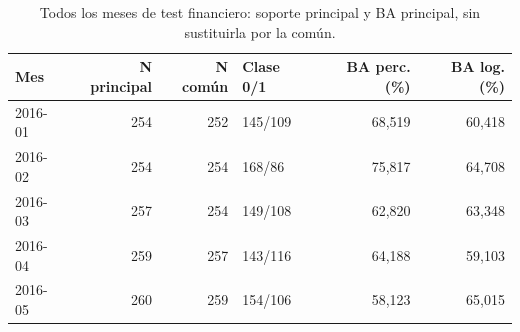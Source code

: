 \begin{table}[htbp]
\centering\small
\caption{Todos los meses de test financiero: soporte principal y BA principal, sin sustituirla por la común.}\label{tab:tf-mensual}
\begin{tabular}{lrrlrr}\toprule
Mes & N principal & N común & Clase 0/1 & BA perc. (\%) & BA log. (\%) \\ \midrule
2016-01 & 254 & 252 & 145/109 & 68,519 & 60,418 \\
2016-02 & 254 & 254 & 168/86 & 75,817 & 64,708 \\
2016-03 & 257 & 254 & 149/108 & 62,820 & 63,348 \\
2016-04 & 259 & 257 & 143/116 & 64,188 & 59,103 \\
2016-05 & 260 & 259 & 154/106 & 58,123 & 65,015 \\
\bottomrule\end{tabular}
\end{table}
